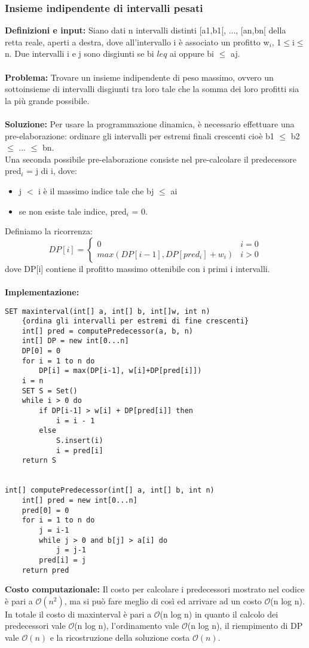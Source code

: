 \documentclass[../cheatSheetAlgoritmi.tex]{subfiles}
\begin{document}
\subsubsection{Insieme indipendente di intervalli pesati}
\textbf{Definizioni e input:} Siano dati n intervalli distinti [a1,b1[, ..., [an,bn[ della retta reale, aperti a destra, dove all'intervallo i è associato un profitto w$_{i}$, 1$\leq$i$\leq$n.
Due intervalli i e j sono disgiunti se bi $leq$ ai oppure bi $\leq$ aj.\\\\ 
\textbf{Problema:} Trovare un insieme indipendente di peso massimo, ovvero un sottoinsieme di intervalli disgiunti tra loro tale che la somma dei loro profitti sia la più grande possibile.\\\\
\textbf{Soluzione:} Per usare la programmazione dinamica, è necessario effettuare una pre-elaborazione: ordinare gli intervalli per estremi finali crescenti cioè b1 $\leq$ b2 $\leq$ ... $\leq$ bn. \\
Una seconda possibile pre-elaborazione consiste nel pre-calcolare il predecessore pred$_{i}$ = j di i, dove: 
\begin{itemize}
	\item j $<$ i è il massimo indice tale che bj $\leq$ ai
	\item se non esiste tale indice, pred$_{i}$ = 0.
\end{itemize}
Definiamo la ricorrenza:
\begin{equation*}
  	DP[i] =\begin{cases}
    	0 & \text{$i = 0$}\\
    	max(DP[i-1], DP[pred_{i}] + w_{i})  & \text{$i > 0$}   	
  	\end{cases}
\end{equation*}
dove DP[i] contiene il profitto massimo ottenibile con i primi i intervalli.\\\\
\newpage
\noindent
\textbf{Implementazione:}
\begin{lstlisting}[caption= Insieme indipendente di intervalli pesati]
SET maxinterval(int[] a, int[] b, int[]w, int n)
	{ordina gli intervalli per estremi di fine crescenti}
	int[] pred = computePredecessor(a, b, n)
	int[] DP = new int[0...n]
	DP[0] = 0
	for i = 1 to n do
		DP[i] = max(DP[i-1], w[i]+DP[pred[i]])
	i = n
	SET S = Set()
	while i > 0 do
		if DP[i-1] > w[i] + DP[pred[i]] then
			i = i - 1
		else
			S.insert(i)
			i = pred[i]
	return S

	
int[] computePredecessor(int[] a, int[] b, int n)
	int[] pred = new int[0...n]
	pred[0] = 0
	for i = 1 to n do
		j = i-1
		while j > 0 and b[j] > a[i] do
			j = j-1
		pred[i] = j
	return pred
\end{lstlisting}
\textbf{Costo computazionale:} Il costo per calcolare i predecessori mostrato nel codice è pari a $\mathcal{O}(n^{2})$, ma si può fare meglio di così ed arrivare ad un costo $\mathcal{O}$(n  log n).
In totale il costo di maxinterval è pari a $\mathcal{O}$(n log n) in quanto il calcolo dei predecessori vale $\mathcal{O}$(n log n), l'ordinamento vale $\mathcal{O}$(n log n), il riempimento di DP vale $\mathcal{O}(n)$  e la ricostruzione della soluzione costa $\mathcal{O}(n)$.
\end{document}

